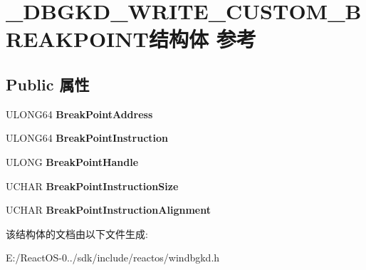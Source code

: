 \hypertarget{struct___d_b_g_k_d___w_r_i_t_e___c_u_s_t_o_m___b_r_e_a_k_p_o_i_n_t}{}\section{\+\_\+\+D\+B\+G\+K\+D\+\_\+\+W\+R\+I\+T\+E\+\_\+\+C\+U\+S\+T\+O\+M\+\_\+\+B\+R\+E\+A\+K\+P\+O\+I\+N\+T结构体 参考}
\label{struct___d_b_g_k_d___w_r_i_t_e___c_u_s_t_o_m___b_r_e_a_k_p_o_i_n_t}
\subsection*{Public 属性}
\begin{DoxyCompactItemize}
\item 
\mbox{\label{struct___d_b_g_k_d___w_r_i_t_e___c_u_s_t_o_m___b_r_e_a_k_p_o_i_n_t_ae1518f09ec57dd154baa03709718cdbf}} 
U\+L\+O\+N\+G64 {\bfseries Break\+Point\+Address}
\item 
\mbox{\label{struct___d_b_g_k_d___w_r_i_t_e___c_u_s_t_o_m___b_r_e_a_k_p_o_i_n_t_a6bf3f1ed95c70facc8140f6d8326d74d}} 
U\+L\+O\+N\+G64 {\bfseries Break\+Point\+Instruction}
\item 
\mbox{\label{struct___d_b_g_k_d___w_r_i_t_e___c_u_s_t_o_m___b_r_e_a_k_p_o_i_n_t_aedd81a6c874e09fa9cc482c5580f2a78}} 
U\+L\+O\+NG {\bfseries Break\+Point\+Handle}
\item 
\mbox{\label{struct___d_b_g_k_d___w_r_i_t_e___c_u_s_t_o_m___b_r_e_a_k_p_o_i_n_t_a990e334bdda6335499a02e86b0a5a1a7}} 
U\+C\+H\+AR {\bfseries Break\+Point\+Instruction\+Size}
\item 
\mbox{\label{struct___d_b_g_k_d___w_r_i_t_e___c_u_s_t_o_m___b_r_e_a_k_p_o_i_n_t_a5614fb797ca517dd2afe1352b2a3032e}} 
U\+C\+H\+AR {\bfseries Break\+Point\+Instruction\+Alignment}
\end{DoxyCompactItemize}


该结构体的文档由以下文件生成\+:\begin{DoxyCompactItemize}
\item 
E\+:/\+React\+O\+S-\/0../sdk/include/reactos/windbgkd.\+h\end{DoxyCompactItemize}
